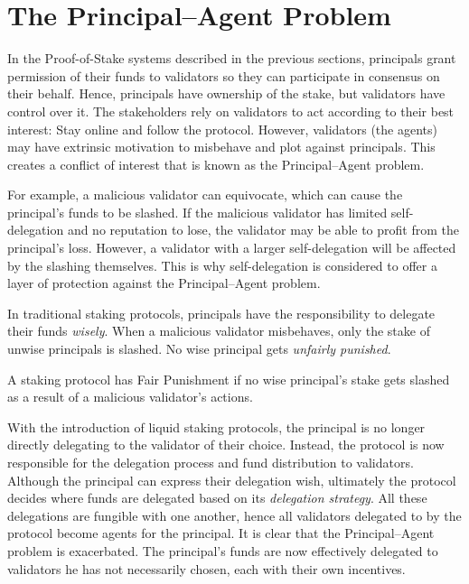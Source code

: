 \section{The Principal--Agent Problem}
In the Proof-of-Stake systems described in the previous sections,
principals grant permission of their funds to validators so they can
participate in consensus on their behalf.
Hence, principals have ownership of the stake, but
validators have control over it.
The stakeholders rely on validators to act according to their
best interest: Stay online and follow the protocol.
However, validators (the agents) may have extrinsic motivation to
misbehave and plot against principals. This creates
a conflict of interest that is known as the Principal--Agent problem.

For example, a malicious validator can equivocate, which can cause
the principal's funds to be slashed. If the malicious validator has
limited self-delegation and no reputation to lose, the validator
may be able to profit from the principal's loss. However, a validator
with a larger self-delegation will be affected by the slashing themselves.
This is why self-delegation is considered to offer a layer of protection
against the Principal--Agent problem.

In traditional staking protocols, principals have the responsibility to
delegate their funds \emph{wisely}.
When a malicious validator misbehaves, only the stake of unwise principals is
slashed. No wise principal gets \emph{unfairly punished}.

\begin{definition}
    A staking protocol has Fair Punishment if no wise principal's
    stake gets slashed as a result of a malicious validator's actions.
\end{definition}

With the introduction of liquid staking protocols, the principal
is no longer directly delegating to the validator of their choice.
Instead, the protocol is now responsible for the delegation process
and fund distribution to validators.
Although the principal can express their delegation wish, ultimately
the protocol decides where funds are delegated based on its
\emph{delegation strategy}. All these delegations are fungible
with one another, hence all validators delegated to by
the protocol become agents for the principal.
It is clear that the Principal--Agent problem is exacerbated.
The principal's funds are now effectively delegated to validators
he has not necessarily chosen, each with their own
incentives.